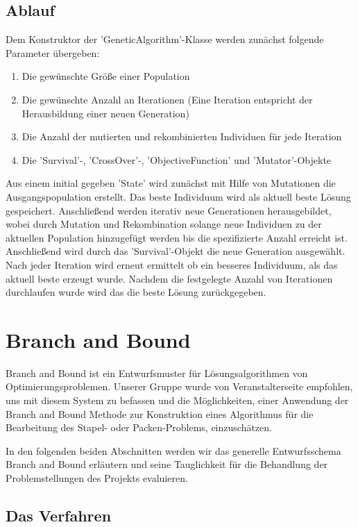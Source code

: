 \documentclass[runningheads,a4paper]{llncs}
\begin{document}
\subsection{Ablauf}

Dem Konstruktor der 'GeneticAlgorithm'-Klasse werden zunächst folgende Parameter übergeben:
\begin{enumerate}
\item Die gewünschte Größe einer Population 
\item Die gewünschte Anzahl an Iterationen (Eine Iteration entspricht der Herausbildung einer neuen Generation)
\item Die Anzahl der mutierten und rekombinierten Individuen für jede Iteration
\item Die 'Survival'-, 'CrossOver'-, 'ObjectiveFunction' und 'Mutator'-Objekte
\end{enumerate}
Aus einem initial gegeben 'State' wird zunächst mit Hilfe von Mutationen die Ausgangspopulation erstellt. Das beste Individuum wird als aktuell beste Lösung gespeichert. Anschließend werden iterativ neue Generationen herausgebildet, wobei durch Mutation und Rekombination solange neue Individuen zu der aktuellen Population hinzugefügt werden bis die spezifizierte Anzahl erreicht ist. Anschließend wird durch das 'Survival'-Objekt die neue Generation ausgewählt. Nach jeder Iteration wird erneut ermittelt ob ein besseres Individuum, als das aktuell beste erzeugt wurde. Nachdem die festgelegte Anzahl von Iterationen durchlaufen wurde wird das die beste Lösung zurückgegeben. 

\section{Branch and Bound}

Branch and Bound ist ein Entwurfsmuster für Lösungsalgorithmen von Optimierungsproblemen. Unserer Gruppe wurde von Veranstalterseite empfohlen, uns mit diesem System zu befassen und  die Möglichkeiten, einer Anwendung der Branch and Bound Methode zur Konstruktion eines Algorithmus für die Bearbeitung des Stapel- oder Packen-Problems, einzuschätzen.

In den folgenden beiden Abschnitten werden wir das generelle Entwurfsschema Branch and Bound erläutern und seine Tauglichkeit für die Behandlung der Problemstellungen des Projekts evaluieren.

\subsection{Das Verfahren}
\end{document}
